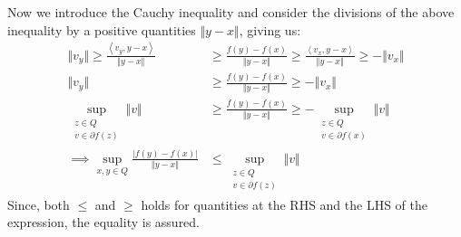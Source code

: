 \documentclass[]{article}
\begin{document}
    Now we introduce the Cauchy inequality and consider the divisions of the above inequality by a positive quantities $\Vert y - x \Vert$, giving us: 
    \begin{align*}\tag{3.51.3}\label{eqn:3.51.3}
        \Vert v_y\Vert \ge 
        \frac{\left\langle v_y, y - x \right\rangle}{\Vert y - x\Vert}
        & \ge
        \frac{f(y) - f(x)}{\Vert y - x\Vert} \ge 
        \frac{\left\langle v_x, y - x \right\rangle}{\Vert y - x\Vert} \ge 
        - \Vert v_x\Vert
        \\
        \Vert v_y \Vert & \ge \frac{f(y) - f(x)}{\Vert y - x\Vert} \ge - \Vert v_x\Vert
        \\
        \sup_{\substack{z \in Q \\ v \in \partial f(z)}} \Vert v\Vert 
        & \ge 
        \frac{f(y) - f(x)}{\Vert y - x\Vert} \ge - \sup_{\substack{z \in Q \\ v \in \partial f(x)}} \Vert v\Vert
        \\
        \implies 
        \sup_{x, y\in Q} \frac{|f(y) - f(x)|}{\Vert y - x\Vert}
        &\le \sup_{\substack{z \in Q \\ v \in \partial f(z)}} \Vert v\Vert
    \end{align*}
    Since, both $\le$ and $\ge$ holds for quantities at the RHS and the LHS of the expression, the equality is assured. 
\end{document}
